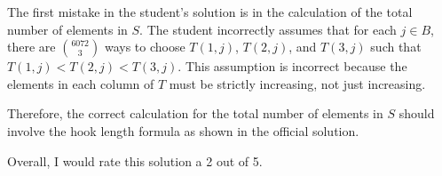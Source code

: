 The first mistake in the student's solution is in the calculation of the total number of elements in $S$. The student incorrectly assumes that for each $j \in B$, there are $\binom{6072}{3}$ ways to choose $T(1,j)$, $T(2,j)$, and $T(3,j)$ such that $T(1,j) < T(2,j) < T(3,j)$. This assumption is incorrect because the elements in each column of $T$ must be strictly increasing, not just increasing. 

Therefore, the correct calculation for the total number of elements in $S$ should involve the hook length formula as shown in the official solution. 

Overall, I would rate this solution a 2 out of 5.
